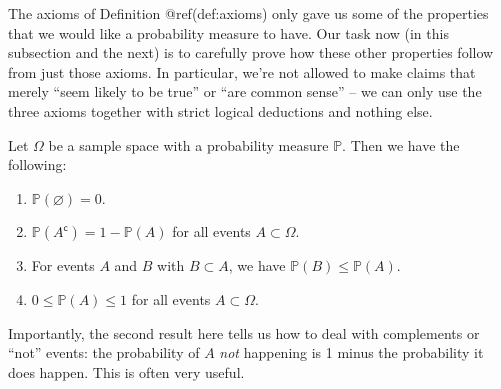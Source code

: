 \documentclass[
  letterpaper,
  DIV=11,
  numbers=noendperiod]{scrreprt}
\providecommand{\tightlist}{%
  \setlength{\itemsep}{0pt}\setlength{\parskip}{0pt}}\usepackage{longtable,booktabs,array}
\theoremstyle{remark}
\begin{document}
The axioms of Definition @ref(def:axioms) only gave us some of the
properties that we would like a probability measure to have. Our task
now (in this subsection and the next) is to carefully prove how these
other properties follow from just those axioms. In particular, we're not
allowed to make claims that merely ``seem likely to be true'' or ``are
common sense'' -- we can only use the three axioms together with strict
logical deductions and nothing else.

Let \(\Omega\) be a sample space with a probability measure
\(\mathbb P\). Then we have the following:

\begin{enumerate}
\def\labelenumi{\arabic{enumi}.}
\tightlist
\item
  \(\mathbb P(\varnothing) = 0\).
\item
  \(\mathbb P(A^\mathsf{c}) = 1 - \mathbb P(A)\) for all events
  \(A \subset \Omega\).
\item
  For events \(A\) and \(B\) with \(B \subset A\), we have
  \(\mathbb P(B) \leq \mathbb P(A)\).
\item
  \(0 \leq \mathbb P(A) \leq 1\) for all events \(A \subset \Omega\).
\end{enumerate}

Importantly, the second result here tells us how to deal with
complements or ``not'' events: the probability of \(A\) \emph{not}
happening is 1 minus the probability it does happen. This is often very
useful.
\end{document}
